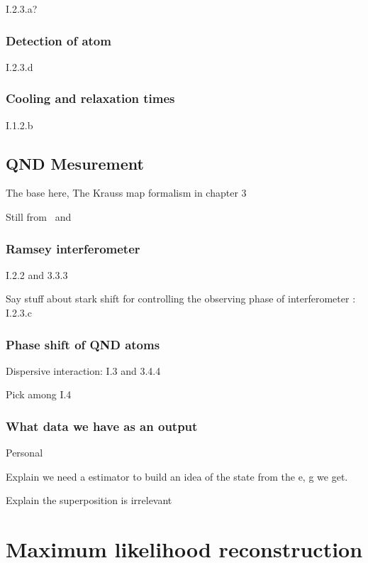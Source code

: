 \documentclass[10pt]{report}
\theoremstyle{plain}
\theoremstyle{definition}
\theoremstyle{remark}
\begin{document}
I.2.3.a?

\subsection{Detection of atom}

I.2.3.d


\subsection{Cooling and relaxation times}

I.1.2.b


\section{QND Mesurement}

The base here, The Krauss map formalism in chapter 3

Still from~\cite{Har06} and~\cite{SayPHD11}

\subsection{Ramsey interferometer}

I.2.2 and 3.3.3

Say stuff about stark shift for controlling the observing phase of
interferometer : I.2.3.c

\subsection{Phase shift of QND atoms}

Dispersive interaction: I.3 and 3.4.4

Pick among I.4

\subsection{What data we have as an output}

Personal

Explain we need a estimator to build an idea of the state from the e, g we get.

Explain the superposition is irrelevant





\chapter{Maximum likelihood reconstruction}
\end{document}
